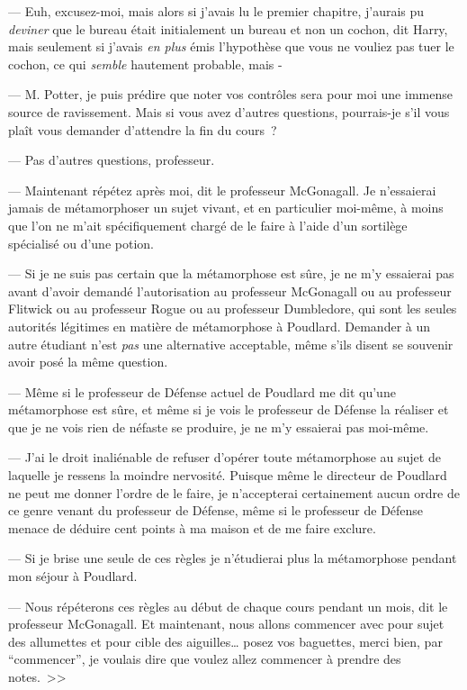 --- Euh, excusez-moi, mais alors si j'avais lu le premier chapitre, j'aurais pu \emph{deviner} que le bureau était initialement un bureau et non un cochon, dit Harry, mais seulement si j'avais \emph{en plus} émis l'hypothèse que vous ne vouliez pas tuer le cochon, ce qui \emph{semble} hautement probable, mais -

--- M. Potter, je puis prédire que noter vos contrôles sera pour moi une immense source de ravissement. Mais si vous avez d'autres questions, pourrais-je s'il vous plaît vous demander d'attendre la fin du cours~?

--- Pas d'autres questions, professeur.

--- Maintenant répétez après moi, dit le professeur McGonagall. Je n'essaierai jamais de métamorphoser un sujet vivant, et en particulier moi-même, à moins que l'on ne m'ait spécifiquement chargé de le faire à l'aide d'un sortilège spécialisé ou d'une potion.

--- Si je ne suis pas certain que la métamorphose est sûre, je ne m'y essaierai pas avant d'avoir demandé l'autorisation au professeur McGonagall ou au professeur Flitwick ou au professeur Rogue ou au professeur Dumbledore, qui sont les seules autorités légitimes en matière de métamorphose à Poudlard. Demander à un autre étudiant n'est \emph{pas} une alternative acceptable, même s'ils disent se souvenir avoir posé la même question.

--- Même si le professeur de Défense actuel de Poudlard me dit qu'une métamorphose est sûre, et même si je vois le professeur de Défense la réaliser et que je ne vois rien de néfaste se produire, je ne m'y essaierai pas moi-même.

--- J'ai le droit inaliénable de refuser d'opérer toute métamorphose au sujet de laquelle je ressens la moindre nervosité. Puisque même le directeur de Poudlard ne peut me donner l'ordre de le faire, je n'accepterai certainement aucun ordre de ce genre venant du professeur de Défense, même si le professeur de Défense menace de déduire cent points à ma maison et de me faire exclure.

--- Si je brise une seule de ces règles je n'étudierai plus la métamorphose pendant mon séjour à Poudlard.

--- Nous répéterons ces règles au début de chaque cours pendant un mois, dit le professeur McGonagall. Et maintenant, nous allons commencer avec pour sujet des allumettes et pour cible des aiguilles… posez vos baguettes, merci bien, par “commencer”, je voulais dire que voulez allez commencer à prendre des notes.~>>

